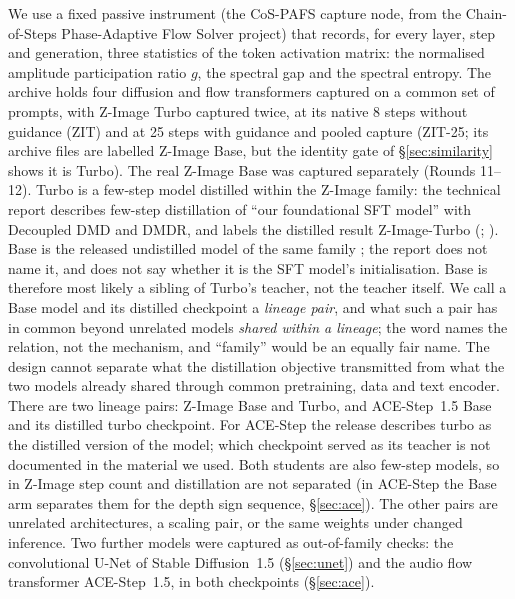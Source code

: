 \documentclass[11pt]{article}
\newcommand{\TT}{ZIT-25}%
\begin{document}
We use a fixed passive instrument (the CoS-PAFS capture node, from the Chain-of-Steps Phase-Adaptive Flow Solver project) that records, for every layer, step and generation, three statistics of the token activation matrix: the normalised amplitude participation ratio $g$, the spectral gap and the spectral entropy. The archive holds four diffusion and flow transformers captured on a common set of prompts, with Z-Image Turbo captured twice, at its native 8 steps without guidance (ZIT) and at 25 steps with guidance and pooled capture (\TT{}; its archive files are labelled Z-Image Base, but the identity gate of \S\ref{sec:similarity} shows it is Turbo). The real Z-Image Base was captured separately (Rounds 11--12). Turbo is a few-step model distilled within the Z-Image family: the technical report describes few-step distillation of ``our foundational SFT model'' with Decoupled DMD and DMDR, and labels the distilled result Z-Image-Turbo (\citealp[\S4.5 and Fig.~13]{zimageteam2025zimage}; \citealp{liu2025decoupled}). Base is the released undistilled model of the same family \citep{tongyi2026zimage}; the report does not name it, and does not say whether it is the SFT model's initialisation. Base is therefore most likely a sibling of Turbo's teacher, not the teacher itself. We call a Base model and its distilled checkpoint a \emph{lineage pair}, and what such a pair has in common beyond unrelated models \emph{shared within a lineage}; the word names the relation, not the mechanism, and ``family'' would be an equally fair name. The design cannot separate what the distillation objective transmitted from what the two models already shared through common pretraining, data and text encoder. There are two lineage pairs: Z-Image Base and Turbo, and ACE-Step~1.5 Base and its distilled turbo checkpoint. For ACE-Step the release describes turbo as the distilled version of the model; which checkpoint served as its teacher is not documented in the material we used. Both students are also few-step models, so in Z-Image step count and distillation are not separated (in ACE-Step the Base arm separates them for the depth sign sequence, \S\ref{sec:ace}). The other pairs are unrelated architectures, a scaling pair, or the same weights under changed inference. Two further models were captured as out-of-family checks: the convolutional U-Net of Stable Diffusion~1.5 (\S\ref{sec:unet}) and the audio flow transformer ACE-Step~1.5, in both checkpoints (\S\ref{sec:ace}).
\end{document}

